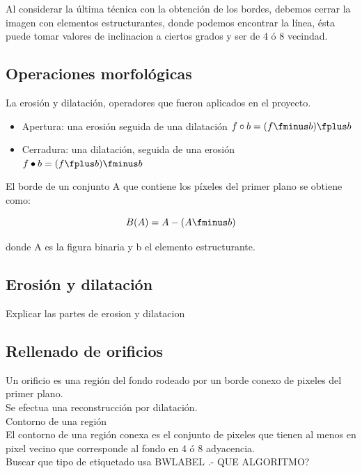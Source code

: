 \documentclass[a4paper, 11pt]{article}
\begin{document}
Al considerar la última técnica con la obtención de los bordes, debemos cerrar la imagen con elementos estructurantes, donde podemos encontrar la línea, ésta puede tomar valores de inclinacion a ciertos grados y ser de 4 ó 8 vecindad.\\

\subsection{Operaciones morfológicas}

La erosión y dilatación, operadores que fueron aplicados en el proyecto.

\begin{itemize}
\item Apertura: una erosión seguida de una dilatación $f \circ b = (f \fminus b) \fplus b$
\item Cerradura: una dilatación, seguida de una erosión $f \bullet b = (f \fplus b) \fminus b$
\end{itemize}

El borde de un conjunto A que contiene los píxeles del primer plano se obtiene como:

\[B(A) = A - (A \fminus b)\]

donde A es la figura binaria y b el elemento estructurante.

\subsection{Erosión y dilatación}

Explicar las partes de erosion y dilatacion

\subsection{Rellenado de orificios}

Un orificio es una región del fondo rodeado por un borde conexo de pixeles del primer plano.\\

Se efectua una reconstrucción por dilatación.\\

Contorno de una región\\

El contorno de una región conexa es el conjunto de pixeles que tienen al menos en pixel vecino que corresponde al fondo en 4 ó 8 adyacencia.\\


Buscar que tipo de etiquetado usa BWLABEL .- QUE ALGORITMO?\\
\end{document}
